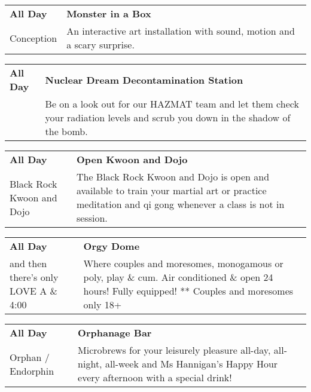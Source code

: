 \begin{tabular}{ p{1in} p{2.2in} }
    \textbf{All Day} & \textbf{Monster in a Box} \\
    Conception \newline  & An interactive art installation with sound, motion and a scary surprise. \\
    \hline 
\end{tabular}
    
\begin{tabular}{ p{1in} p{2.2in} }
    \textbf{All Day} & \textbf{Nuclear Dream Decontamination Station} \\
    ~ \newline  & Be on a look out for our HAZMAT team and let them check your radiation levels and scrub you down in the shadow of the bomb. \\
    \hline 
\end{tabular}
    
\begin{tabular}{ p{1in} p{2.2in} }
    \textbf{All Day} & \textbf{Open Kwoon and Dojo} \\
    Black Rock Kwoon and Dojo \newline  & The Black Rock Kwoon and Dojo is open and available to train your martial art or practice meditation and qi gong whenever a class is not in session. \\
    \hline 
\end{tabular}
    
\begin{tabular}{ p{1in} p{2.2in} }
    \textbf{All Day} & \textbf{Orgy Dome} \\
    and then there's only LOVE \newline A \& 4:00 & Where couples and moresomes, monogamous or poly, play \& cum.  Air conditioned \& open 24 hours! Fully equipped! ** Couples and moresomes only 18+ \\
    \hline 
\end{tabular}
    
\begin{tabular}{ p{1in} p{2.2in} }
    \textbf{All Day} & \textbf{Orphanage Bar} \\
    Orphan / Endorphin \newline  & Microbrews for your leisurely pleasure all-day, all-night, all-week and Ms Hannigan's Happy Hour every afternoon with a special drink! \\
    \hline 
\end{tabular}
    
